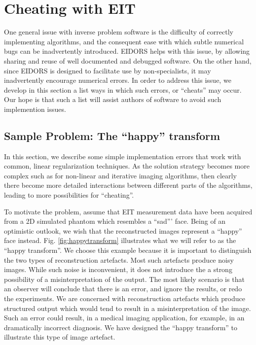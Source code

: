 \documentclass[12pt]{iopart}
\begin{document}
\section{
 Cheating with EIT
}

One general issue with inverse problem software is the difficulty
of correctly implementing algorithms, and the consequent ease with
which subtle numerical bugs can be inadvertently introduced.
EIDORS helps with this issue, by allowing sharing and reuse
of well documented and debugged software. On the other hand, 
since EIDORS is designed to facilitate use by non-specialists,
it may inadvertently encourage numerical errors.
In order to address this issue, we develop in this section
a list ways in which such errors, or ``cheats'' may occur.
Our hope is that such a list will assist authors of software
to avoid such implemention issues.

\subsection{
Sample Problem: The ``happy'' transform
}

In this section, we describe some simple implementation
errors that work with common, linear
regularization techniques. As the solution
strategy becomes more complex such as for non-linear 
and iterative imaging algorithms, then clearly there
become more detailed interactions between different 
parts of the algorithms, leading to more possibilities
for ``cheating''.

To motivate the problem, assume that EIT measurement
data have been acquired from a 2D simulated phantom which resembles
a ``sad''' face. Being of an optimistic outlook, we wish
that the reconstructed images represent a ``happy'' face
instead. Fig. \ref{fig:happytransform}
illustrates what we will refer to as the ``happy transform''.
We choose this example because it is important to distinguish
the  two types of reconstruction artefacts. Most such artefacts
produce noisy images. While such noise is inconvenient, it does
not introduce the a strong possibility of a misinterpretation of the
output. The most likely scenario is that an observer will conclude
that there is an error, and ignore the results, or redo the experiments.
We are concerned with reconstruction artefacts which
produce structured output which would tend to result in a 
misinterpretation of the image. Such an error could result, in a
medical imaging application, for example, in an dramatically
incorrect diagnosis. We have designed the ``happy transform''
to illustrate this type of image artefact.
\end{document}
